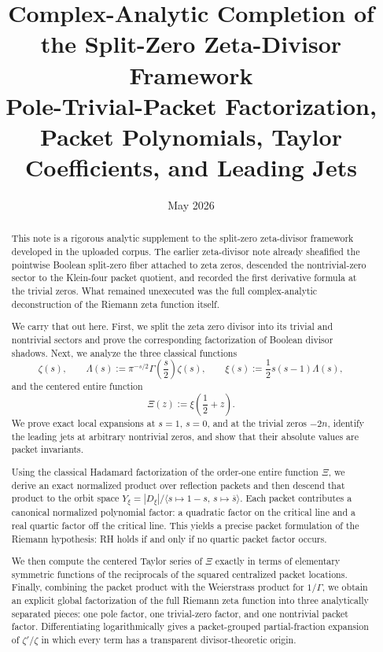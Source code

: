 \documentclass[11pt,a4paper]{article}
\title{Complex-Analytic Completion of the Split-Zero Zeta-Divisor Framework\\
Pole-Trivial-Packet Factorization, Packet Polynomials, Taylor Coefficients, and Leading Jets}
\author{}
\date{May 2026}
\theoremstyle{definition}
\theoremstyle{remark}
\begin{document}
\maketitle

\begin{abstract}
This note is a rigorous analytic supplement to the split-zero zeta-divisor framework developed in the uploaded corpus.  The earlier zeta-divisor note already sheafified the pointwise Boolean split-zero fiber attached to zeta zeros, descended the nontrivial-zero sector to the Klein-four packet quotient, and recorded the first derivative formula at the trivial zeros.  What remained unexecuted was the full complex-analytic deconstruction of the Riemann zeta function itself.

We carry that out here.  First, we split the zeta zero divisor into its trivial and nontrivial sectors and prove the corresponding factorization of Boolean divisor shadows.  Next, we analyze the three classical functions
\[
\zeta(s),\qquad \Lambda(s):=\pi^{-s/2}\Gamma\!\left(\frac{s}{2}\right)\zeta(s),
\qquad
\xi(s):=\frac12 s(s-1)\Lambda(s),
\]
and the centered entire function
\[
\Xi(z):=\xi\!\left(\frac12+z\right).
\]
We prove exact local expansions at $s=1$, $s=0$, and at the trivial zeros $-2n$, identify the leading jets at arbitrary nontrivial zeros, and show that their absolute values are packet invariants.

Using the classical Hadamard factorization of the order-one entire function $\Xi$, we derive an exact normalized product over reflection packets and then descend that product to the orbit space $Y_\xi=|D_\xi|/\langle s\mapsto 1-s,\,s\mapsto \overline s\rangle$.  Each packet contributes a canonical normalized polynomial factor: a quadratic factor on the critical line and a real quartic factor off the critical line.  This yields a precise packet formulation of the Riemann hypothesis: RH holds if and only if no quartic packet factor occurs.

We then compute the centered Taylor series of $\Xi$ exactly in terms of elementary symmetric functions of the reciprocals of the squared centralized packet locations.  Finally, combining the packet product with the Weierstrass product for $1/\Gamma$, we obtain an explicit global factorization of the full Riemann zeta function into three analytically separated pieces: one pole factor, one trivial-zero factor, and one nontrivial packet factor.  Differentiating logarithmically gives a packet-grouped partial-fraction expansion of $\zeta'/\zeta$ in which every term has a transparent divisor-theoretic origin.
\end{abstract}
\end{document}
